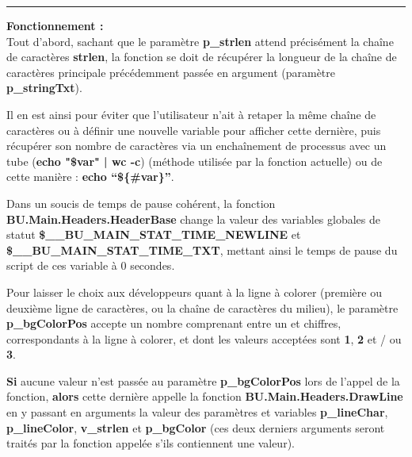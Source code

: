 \documentclass[a4paper,10pt]{article}
\begin{document}
    \setlength{\parskip}{2em}
    \par\noindent\rule{\textwidth}{0.4pt}\setlength{\parskip}{1em}

    \begin{justify}
        \textbf{Fonctionnement :}\\[1\baselineskip]
        Tout d'abord, sachant que le paramètre \textbf{\color{vars}p\_strlen} attend précisément la chaîne de caractères \textbf{strlen}, la fonction se doit de récupérer la longueur de la chaîne de caractères principale précédemment passée en argument (paramètre \textbf{\color{vars}p\_stringTxt}).
    \end{justify}

    \begin{justify}
        Il en est ainsi pour éviter que l'utilisateur n'ait à retaper la même chaîne de caractères ou à définir une nouvelle variable pour afficher cette dernière, puis récupérer son nombre de caractères via un enchaînement de processus avec un tube (\textbf{\color{cmds}echo \color{vars}"\$var" \color{text} | \color{cmds}wc -c}) (méthode utilisée par la fonction actuelle) ou de cette manière : \textbf{\color{cmds}echo \color{vars}``\$\{\#var\}''}.
    \end{justify}

    \setlength{\parskip}{2em}


    \begin{justify}
        Dans un soucis de temps de pause cohérent, la fonction \textbf{\color{func}BU.Main.Headers.HeaderBase} change la valeur des variables globales de statut \textbf{\color{vars}\$\_\_BU\_MAIN\_STAT\_TIME\_NEWLINE} et \textbf{\color{vars}\$\_\_BU\_MAIN\_STAT\_TIME\_TXT}, mettant ainsi le temps de pause du script de ces variable à 0 secondes.\par
    \end{justify}

    \begin{justify}
        Pour laisser le choix aux développeurs quant à la ligne à colorer (première ou deuxième ligne de caractères, ou la chaîne de caractères du milieu), le paramètre \textbf{\color{vars}p\_bgColorPos} accepte un nombre comprenant entre un et chiffres, correspondants à la ligne à colorer, et dont les valeurs acceptées sont \textbf{1}, \textbf{2} et / ou \textbf{3}.
    \end{justify}

    \setlength{\parskip}{1em}

    \begin{justify}
        \textbf{\color{cond}Si} aucune valeur n'est passée au paramètre \textbf{\color{vars}p\_bgColorPos} lors de l'appel de la fonction, \textbf{\color{cond}alors} cette dernière appelle la fonction \textbf{\color{func}BU.Main.Headers.DrawLine} en y passant en arguments la valeur des paramètres et variables \textbf{\color{vars}p\_lineChar}, \textbf{\color{vars}p\_lineColor}, \textbf{\color{vars}v\_strlen} et \textbf{\color{vars}p\_bgColor} (ces deux derniers arguments seront traités par la fonction appelée s'ils contiennent une valeur).
    \end{justify}
\end{document}
